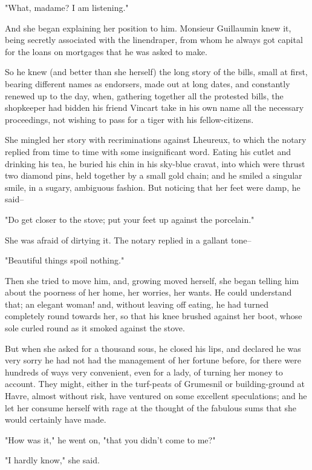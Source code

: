 \documentclass[11pt,twocolumn]{ltugboat}
\begin{document}
"What, madame? I am listening."

And she began explaining her position to him. Monsieur Guillaumin knew
it, being secretly associated with the linendraper, from whom he always
got capital for the loans on mortgages that he was asked to make.

So he knew (and better than she herself) the long story of the bills,
small at first, bearing different names as endorsers, made out at long
dates, and constantly renewed up to the day, when, gathering together
all the protested bills, the shopkeeper had bidden his friend Vincart
take in his own name all the necessary proceedings, not wishing to pass
for a tiger with his fellow-citizens.

She mingled her story with recriminations against Lheureux, to which the
notary replied from time to time with some insignificant word. Eating
his cutlet and drinking his tea, he buried his chin in his sky-blue
cravat, into which were thrust two diamond pins, held together by a
small gold chain; and he smiled a singular smile, in a sugary, ambiguous
fashion. But noticing that her feet were damp, he said--

"Do get closer to the stove; put your feet up against the porcelain."

She was afraid of dirtying it. The notary replied in a gallant tone--

"Beautiful things spoil nothing."

Then she tried to move him, and, growing moved herself, she began
telling him about the poorness of her home, her worries, her wants.
He could understand that; an elegant woman! and, without leaving off
eating, he had turned completely round towards her, so that his knee
brushed against her boot, whose sole curled round as it smoked against
the stove.

But when she asked for a thousand sous, he closed his lips, and declared
he was very sorry he had not had the management of her fortune before,
for there were hundreds of ways very convenient, even for a lady, of
turning her money to account. They might, either in the turf-peats
of Grumesnil or building-ground at Havre, almost without risk, have
ventured on some excellent speculations; and he let her consume herself
with rage at the thought of the fabulous sums that she would certainly
have made.

"How was it," he went on, "that you didn't come to me?"

"I hardly know," she said.
\end{document}
